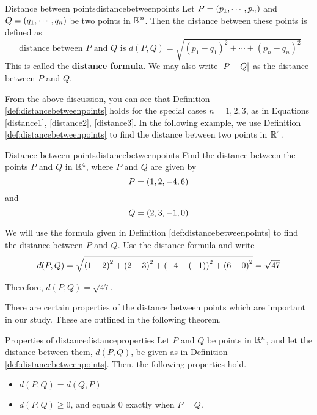 \begin{definition}{Distance between points}{distancebetweenpoints}
Let $P=\left(p_{1},\cdots ,p_{n}\right) $ and 
$Q=\left(q_{1},\cdots ,q_{n}\right) $ be two points in 
$\mathbb{R}^{n}$. Then the distance
between these points is defined as
\begin{equation*}
\text{ distance between }P\text{ and } Q\text{ is } 
d( P, Q ) =\sqrt{ (p_1-q_1)^2 + \cdots + (p_n-q_n)^2}
\end{equation*}
This is called the \textbf{distance formula}. We may also write $\left|P - Q \right|$ as the distance between $P$ and $Q$.
\end{definition}

From the above discussion, you can see that Definition \ref{def:distancebetweenpoints} holds for the special cases $n=1,2,3$, as in 
Equations \ref{distance1}, \ref{distance2}, \ref{distance3}. 
In the following example, we use Definition \ref{def:distancebetweenpoints} to find the distance between two points in
$\mathbb{R}^4$.

\begin{example}{Distance between points}{distancebetweenpoints}
Find the distance between the points $P$ and $Q$ in $\mathbb{R}^{4}$,
where $P$ and $Q$ are given by 
\begin{equation*}
P=\left(1,2,-4,6\right)
\end{equation*}
and
\begin{equation*}
Q=\left(2,3,-1,0\right)
\end{equation*}
\end{example}

\begin{solution}
We will use the formula given in Definition \ref{def:distancebetweenpoints} to find the distance between
$P$ and $Q$. 
Use the distance formula and write
\begin{equation*}
d(P,Q)= \sqrt{ \left(1-2\right) ^{2}+\left(2-3\right)
^{2}+\left(-4-\left(-1\right) \right) ^{2}+\left(6-0\right)^{2}} = \sqrt{47}
\end{equation*}

Therefore, $d( P,Q) =
\sqrt{47}.$

\end{solution}

There are certain properties of the distance between points which are important in our study.
These are outlined in the following theorem.

\begin{theorem}{Properties of distance}{distanceproperties}
Let $P$ and $Q$ be points in $\mathbb{R}^n$, and let the distance between them,
$d( P, Q)$, be given as in Definition \ref{def:distancebetweenpoints}. 
Then, the following properties hold.
\begin{itemize}
\item $ d( P, Q) = d( Q, P)  $
\item $ d( P, Q) \geq 0$, and equals 0 exactly when $P = Q.$
\end{itemize}
\end{theorem}

